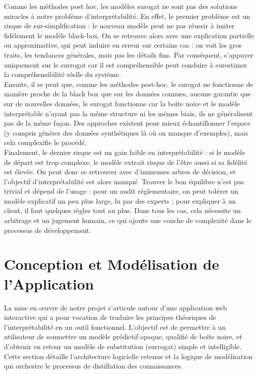 \documentclass{article}
\begin{document}
    \quad Comme les méthodes post hoc, les modèles surogat ne sont pas des solutions miracles à notre problème d'interprétabilité. En effet, le premier problème est un risque de sur-simplification : le nouveau modèle peut ne pas réussir à imiter fidèlement le modèle black-box. On se retrouve alors avec une explication partielle ou approximative, qui peut induire en erreur sur certains cas : on voit les gros traits, les tendances générales, mais pas les détails fins. Par conséquent, s’appuyer uniquement sur le surrogat car il est compréhensible peut conduire à surestimer la compréhensibilité réelle du système.\\
    
    Ensuite, il se peut que, comme les méthodes post-hoc, le surogat ne fonctionne de manière proche de la black box que sur les données connues, aucune garantie que sur de nouvelles données, le surogat fonctionne car la boîte noire et le modèle interprétable n’ayant pas la même structure ni les mêmes biais, ils ne généralisent pas de la même façon. Des approches existent pour mieux échantillonner l’espace (y compris générer des données synthétiques là où on manque d’exemples), mais cela complexifie le procédé.\\
    
    Finalement, le dernier risque est un gain faible en interprétabilité : si le modèle de départ est trop complexe, le modèle extrait risque de l’être aussi si sa fidélité est élevée. On peut donc se retrouver avec d’immenses arbres de décision, et l’objectif d’interprétabilité est alors manqué. Trouver le bon équilibre n’est pas trivial et dépend de l’usage : pour un audit réglementaire, on peut tolérer un modèle explicatif un peu plus large, lu par des experts ; pour expliquer à un client, il faut quelques règles tout au plus. Dans tous les cas, cela nécessite un arbitrage et un jugement humain, ce qui ajoute une couche de complexité dans le processus de développement.

\clearpage

\section{Conception et Modélisation de l'Application}

\quad La mise en œuvre de notre projet s'articule autour d'une application web interactive qui a pour vocation de traduire les principes théoriques de l'interprétabilité en un outil fonctionnel. L'objectif est de permettre à un utilisateur de soumettre un modèle prédictif opaque, qualifié de boîte noire, et d'obtenir en retour un modèle de substitution (surrogat) simple et intelligible. Cette section détaille l'architecture logicielle retenue et la logique de modélisation qui orchestre le processus de distillation des connaissances.
\end{document}
